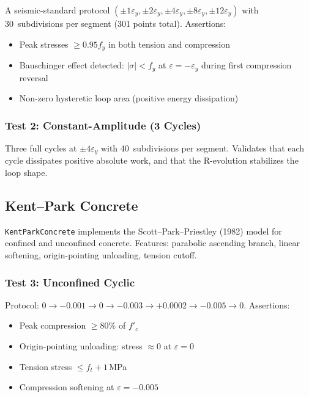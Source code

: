 A seismic-standard protocol $(\pm 1\varepsilon_y, \pm 2\varepsilon_y,
\pm 4\varepsilon_y, \pm 8\varepsilon_y, \pm 12\varepsilon_y)$ with
30~subdivisions per segment (301 points total).  Assertions:

\begin{itemize}
  \item Peak stresses $\geq 0.95 f_y$ in both tension and compression
  \item Bauschinger effect detected: $|\sigma| < f_y$ at
        $\varepsilon = -\varepsilon_y$ during first compression reversal
  \item Non-zero hysteretic loop area (positive energy dissipation)
\end{itemize}

\subsubsection*{Test 2: Constant-Amplitude (3 Cycles)}

Three full cycles at $\pm 4\varepsilon_y$ with 40~subdivisions per
segment.  Validates that each cycle dissipates positive absolute work,
and that the R-evolution stabilizes the loop shape.

\subsection{Kent--Park Concrete}

\texttt{KentParkConcrete} implements the Scott--Park--Priestley (1982)
model for confined and unconfined concrete.  Features: parabolic
ascending branch, linear softening, origin-pointing unloading, tension
cutoff.

\subsubsection*{Test 3: Unconfined Cyclic}

Protocol: $0 \to -0.001 \to 0 \to -0.003 \to +0.0002 \to -0.005 \to 0$.
Assertions:

\begin{itemize}
  \item Peak compression $\geq 80\%$ of $f'_c$
  \item Origin-pointing unloading: stress $\approx 0$ at $\varepsilon=0$
  \item Tension stress $\leq f_t + 1$\,MPa
  \item Compression softening at $\varepsilon = -0.005$
\end{itemize}

